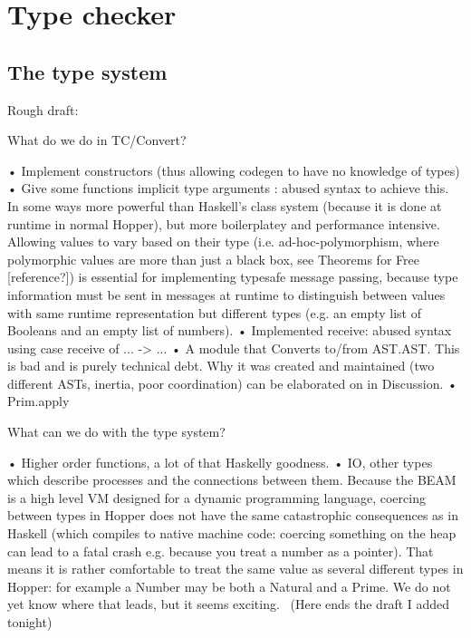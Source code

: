 \section{Type checker}



\subsection{The type system}
Rough draft:
\


What do we do in TC/Convert?\

•	Implement constructors (thus allowing codegen to have no knowledge of types)
•	Give some functions implicit type arguments : abused syntax to achieve this. In some ways more powerful than Haskell’s class system (because it is done at runtime in normal Hopper), but more boilerplatey and performance intensive. Allowing values to vary based on their type (i.e. ad-hoc-polymorphism, where polymorphic values are more than just a black box, see Theorems for Free [reference?]) is essential for implementing typesafe message passing, because type information must be sent in messages at runtime to distinguish between values with same runtime representation but different types (e.g. an empty list of Booleans and an empty list of numbers).
•	Implemented receive: abused syntax using case receive of ... -> ...
•	A module that Converts to/from AST.AST. This is bad and is purely technical debt. Why it was created and maintained (two different ASTs, inertia, poor coordination) can be elaborated on in Discussion.
•	Prim.apply\

What can we do with the type system?\

•	Higher order functions, a lot of that Haskelly goodness.
•	IO, other types which describe processes and the connections between them. Because the BEAM is a high level VM designed for a dynamic programming language, coercing between types in Hopper does not have the same catastrophic consequences as in Haskell (which compiles to native machine code: coercing something on the heap can lead to a fatal crash e.g. because you treat a number as a pointer). That means it is rather comfortable to treat the same value as several different types in Hopper: for example a Number may be both a Natural and a Prime. We do not yet know where that leads, but it seems exciting. 
\
(Here ends the draft I added tonight)
\


